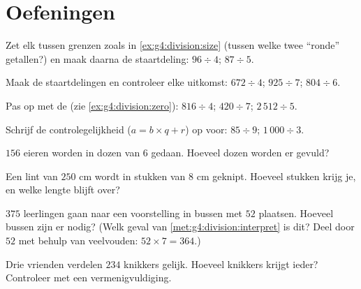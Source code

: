\section{Oefeningen}

\begin{exercise}[$\star$]\label{exo:g4:division:1}
Zet elk  tussen grenzen zoals in \cref{ex:g4:division:size}
(tussen welke twee ``ronde'' getallen?) en maak daarna de staartdeling:
$96 \div 4$; \quad $87 \div 5$.
\end{exercise}

\begin{exercise}[$\star$]\label{exo:g4:division:2}
Maak de staartdelingen en controleer elke uitkomst:
$672 \div 4$; \quad $925 \div 7$; \quad $804 \div 6$.
\end{exercise}

\begin{exercise}[$\star$]\label{exo:g4:division:3}
Pas op met de  (zie \cref{ex:g4:division:zero}):
$816 \div 4$; \quad $420 \div 7$; \quad $2\,512 \div 5$.
\end{exercise}

\begin{exercise}[$\star$]\label{exo:g4:division:4}
Schrijf de controlegelijkheid ($a = b \times q + r$) op voor:
$85 \div 9$; \quad $1\,000 \div 3$.
\end{exercise}

\begin{exercise}[$\star$]\label{exo:g4:division:5}
$156$ eieren worden in dozen van $6$ gedaan. Hoeveel dozen worden er
gevuld?
\end{exercise}

\begin{exercise}[$\star$]\label{exo:g4:division:6}
Een lint van $250$ cm wordt in stukken van $8$ cm geknipt. Hoeveel stukken
krijg je, en welke lengte blijft over?
\end{exercise}

\begin{exercise}[$\star$]\label{exo:g4:division:7}
$375$ leerlingen gaan naar een voorstelling in bussen met $52$ plaatsen.
Hoeveel bussen zijn er nodig? (Welk geval van
\cref{met:g4:division:interpret} is dit? Deel door $52$ met behulp van
veelvouden: $52 \times 7 = 364$.)
\end{exercise}

\begin{exercise}[$\star$]\label{exo:g4:division:8}
Drie vrienden verdelen $234$ knikkers gelijk. Hoeveel knikkers krijgt
ieder? Controleer met een vermenigvuldiging.
\end{exercise}

